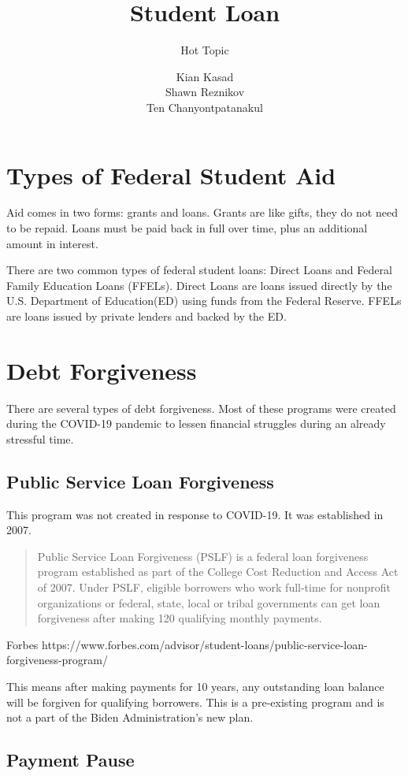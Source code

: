 \documentclass{../khw}
\title{Student Loan}{Debt Forgiveness}
\subtitle{Hot Topic}
\author{
    Kian Kasad\\[4pt]
    Shawn Reznikov\\[4pt]
    Ten Chanyontpatanakul
}
\newcommand{\ed}{Department of Education}
\newcommand{\used}{U.S. \ed}
\begin{document}
\maketitlepage

\section{Types of Federal Student Aid}

Aid comes in two forms: grants and loans. Grants are like gifts, they do not
need to be repaid. Loans must be paid back in full over time, plus an additional
amount in interest.

There are two common types of federal student loans: Direct Loans and Federal
Family Education Loans (FFELs). Direct Loans are loans issued directly by the
\used (ED) using funds from the Federal Reserve. FFELs are loans issued by
private lenders and backed by the ED.

\section{Debt Forgiveness}

There are several types of debt forgiveness. Most of these programs were created
during the COVID-19 pandemic to lessen financial struggles during an already
stressful time.

\subsection{Public Service Loan Forgiveness}

This program was not created in response to COVID-19. It was
established in 2007.

\blockquote{
    Public Service Loan Forgiveness (PSLF) is a federal loan forgiveness program
    established as part of the College Cost Reduction and Access Act of 2007.
    Under PSLF, eligible borrowers who work full-time for nonprofit
    organizations or federal, state, local or tribal governments can get loan
    forgiveness after making 120 qualifying monthly payments.
}{Forbes}%
{https://www.forbes.com/advisor/student-loans/public-service-loan-forgiveness-program/}

This means after making payments for 10 years, any outstanding loan balance will
be forgiven for qualifying borrowers. This is a pre-existing program and is not
a part of the Biden Administration's new plan.


\subsection{Payment Pause}
\end{document}
